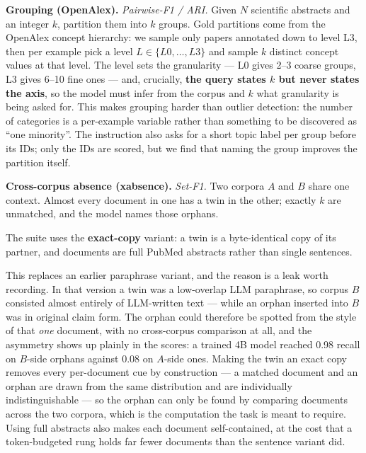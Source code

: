 \textbf{Grouping (OpenAlex).} \emph{Pairwise-F1 / ARI.} Given $N$ scientific abstracts and an integer $k$, partition them into $k$ groups. Gold partitions come from the OpenAlex \citep{Priem2022OpenAlexAF} concept hierarchy: we sample only papers annotated down to level L3, then per example pick a level $L \in \{L0,\ldots,L3\}$ and sample $k$ distinct concept values at that level. The level sets the granularity --- L0 gives 2--3 coarse groups, L3 gives 6--10 fine ones --- and, crucially, \textbf{the query states $k$ but never states the axis}, so the model must infer from the corpus and $k$ what granularity is being asked for. This makes grouping harder than outlier detection: the number of categories is a per-example variable rather than something to be discovered as ``one minority''. The instruction also asks for a short topic label per group before its IDs; only the IDs are scored, but we find that naming the group improves the partition itself.


\textbf{Cross-corpus absence (xabsence).} \emph{Set-F1.} Two corpora $A$ and $B$ share one context. Almost every document in one has a twin in the other; exactly $k$ are unmatched, and the model names those orphans.
\begin{claudeblock}
The suite uses the \textbf{exact-copy} variant: a twin is a byte-identical copy of its partner, and
documents are full PubMed abstracts rather than single sentences.

This replaces an earlier paraphrase variant, and the reason is a leak worth recording. In that
version a twin was a low-overlap LLM paraphrase, so corpus $B$ consisted almost entirely of
LLM-written text --- while an orphan inserted into $B$ was in original claim form. The orphan could
therefore be spotted from the style of that \emph{one} document, with no cross-corpus comparison at
all, and the asymmetry shows up plainly in the scores: a trained 4B model reached 0.98 recall on
$B$-side orphans against 0.08 on $A$-side ones. Making the twin an exact copy removes every
per-document cue by construction --- a matched document and an orphan are drawn from the same
distribution and are individually indistinguishable --- so the orphan can only be found by
comparing documents across the two corpora, which is the  computation the task is meant to
require. Using full abstracts also makes each document self-contained, at the cost that a
token-budgeted rung holds far fewer documents than the sentence variant did.
\end{claudeblock}


